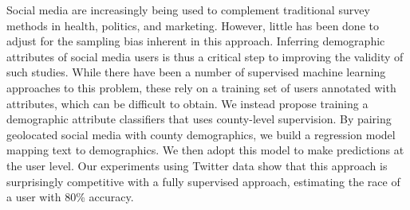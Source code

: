 Social media are increasingly being used to complement traditional survey methods in health, politics, and marketing. However, little has been done to adjust for the sampling bias inherent in this approach. Inferring demographic attributes of social media users is thus a critical step to improving the validity of such studies. While there have been a number of supervised machine learning approaches to this problem, these rely on a training set of users annotated with attributes, which can be difficult to obtain. We instead propose training a demographic attribute classifiers that uses county-level supervision. By pairing geolocated social media with county demographics, we build a regression model mapping text to demographics. We then adopt this model to make predictions at the user level. Our experiments using Twitter data show that this approach is surprisingly competitive with a fully supervised approach, estimating the race of a user with 80\% accuracy.
